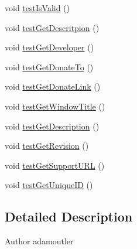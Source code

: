 \begin{DoxyCompactItemize}
\item 
void \hyperlink{class_c_a_s_u_a_l_1_1network_1_1_c_a_s_u_a_l_dev_integration_1_1_c_a_s_u_a_l_package_test_a78ddcc2aeae43bd26fb0ac5d69a8f683}{test\-Is\-Valid} ()
\item 
void \hyperlink{class_c_a_s_u_a_l_1_1network_1_1_c_a_s_u_a_l_dev_integration_1_1_c_a_s_u_a_l_package_test_a1185e7e80a31fba975cbd10ce34fe4a5}{test\-Get\-Descritpion} ()
\item 
void \hyperlink{class_c_a_s_u_a_l_1_1network_1_1_c_a_s_u_a_l_dev_integration_1_1_c_a_s_u_a_l_package_test_afd25c3ef5e30580dc0c78047eac444ca}{test\-Get\-Developer} ()
\item 
void \hyperlink{class_c_a_s_u_a_l_1_1network_1_1_c_a_s_u_a_l_dev_integration_1_1_c_a_s_u_a_l_package_test_a94b4beff38068a6bc5658a15a47b9897}{test\-Get\-Donate\-To} ()
\item 
void \hyperlink{class_c_a_s_u_a_l_1_1network_1_1_c_a_s_u_a_l_dev_integration_1_1_c_a_s_u_a_l_package_test_a7a001e7ba1f169ebc0a0f788edc6fa89}{test\-Get\-Donate\-Link} ()
\item 
void \hyperlink{class_c_a_s_u_a_l_1_1network_1_1_c_a_s_u_a_l_dev_integration_1_1_c_a_s_u_a_l_package_test_a91202af348cc55097f34647efd9c1576}{test\-Get\-Window\-Title} ()
\item 
void \hyperlink{class_c_a_s_u_a_l_1_1network_1_1_c_a_s_u_a_l_dev_integration_1_1_c_a_s_u_a_l_package_test_a247d21395b241afda5f1e48124786878}{test\-Get\-Description} ()
\item 
void \hyperlink{class_c_a_s_u_a_l_1_1network_1_1_c_a_s_u_a_l_dev_integration_1_1_c_a_s_u_a_l_package_test_a75c824a0f45af4af1a44bdcbc43e166e}{test\-Get\-Revision} ()
\item 
void \hyperlink{class_c_a_s_u_a_l_1_1network_1_1_c_a_s_u_a_l_dev_integration_1_1_c_a_s_u_a_l_package_test_a3a64a9b976c6c998ab52cc5177632ed7}{test\-Get\-Support\-U\-R\-L} ()
\item 
void \hyperlink{class_c_a_s_u_a_l_1_1network_1_1_c_a_s_u_a_l_dev_integration_1_1_c_a_s_u_a_l_package_test_a44a4024e162ac4398bc1226282c53f71}{test\-Get\-Unique\-I\-D} ()
\end{DoxyCompactItemize}


\subsection{Detailed Description}
\begin{DoxyAuthor}{Author}
adamoutler 
\end{DoxyAuthor}


